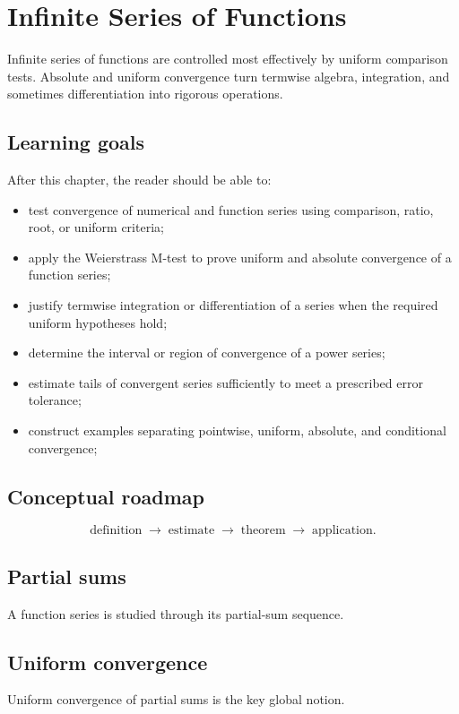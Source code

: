 \chapter{Infinite Series of Functions}
\label{ch:ii13}

Infinite series of functions are controlled most effectively by uniform comparison tests. Absolute and uniform convergence turn termwise algebra, integration, and sometimes differentiation into rigorous operations.

\section*{Learning goals}
After this chapter, the reader should be able to:
\begin{itemize}
\item test convergence of numerical and function series using comparison, ratio, root, or uniform criteria;
\item apply the Weierstrass M-test to prove uniform and absolute convergence of a function series;
\item justify termwise integration or differentiation of a series when the required uniform hypotheses hold;
\item determine the interval or region of convergence of a power series;
\item estimate tails of convergent series sufficiently to meet a prescribed error tolerance;
\item construct examples separating pointwise, uniform, absolute, and conditional convergence;
\end{itemize}
\section*{Conceptual roadmap}
\[
\boxed{\text{definition}\;\longrightarrow\;\text{estimate}\;\longrightarrow\;\text{theorem}\;\longrightarrow\;\text{application}.}
\]

\section{Partial sums}
A function series is studied through its partial-sum sequence.

\section{Uniform convergence}
Uniform convergence of partial sums is the key global notion.

